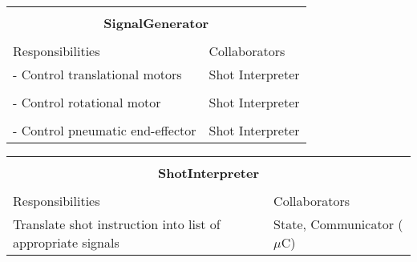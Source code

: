 \documentclass[titlepage]{article}
\begin{document}
\begin{table}[!htbp]
\centering
\begin{tabular}{| p{} | p{} |}\hline
	\multicolumn{2}{|l|}{}\\
	\multicolumn{2}{|c|}{\large{\textbf{SignalGenerator}}}\\
	\multicolumn{2}{|l|}{}\\\hline
	\vspace{0mm}\large{Responsibilities}\vspace{2mm} &\vspace{0mm}\large{Collaborators}\vspace{2mm}\\\hline
	\vspace{0mm}- Control translational motors		&\vspace{0mm}Shot Interpreter\\&\\
	- Control rotational motor						&Shot Interpreter\\&\\
	- Control pneumatic end-effector\vspace{2mm}	&Shot Interpreter\vspace{2mm}\\\hline
\end{tabular}
\end{table}

\begin{table}[!htbp]
\centering
\begin{tabular}{| p{} | p{} |}\hline
	\multicolumn{2}{|l|}{}\\
	\multicolumn{2}{|c|}{\large{\textbf{ShotInterpreter}}}\\
	\multicolumn{2}{|l|}{}\\\hline
	\vspace{0mm}\large{Responsibilities}\vspace{2mm} &\vspace{0mm}\large{Collaborators}\vspace{2mm}\\\hline
	\vspace{0mm}Translate shot instruction into list of appropriate signals 	&\vspace{0mm}State, Communicator ($\mu$C)\vspace{2mm}\\\hline
\end{tabular}
\end{table}
\end{document}
